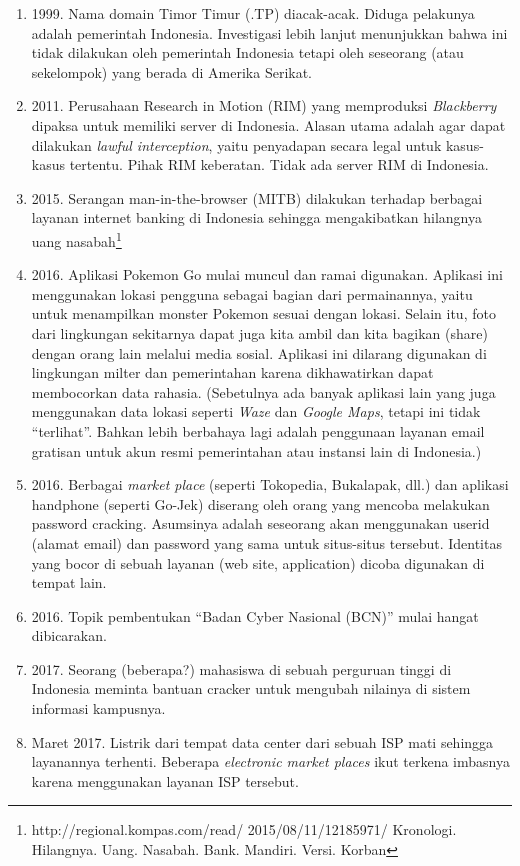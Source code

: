 \begin{enumerate}
\item 1999. Nama domain Timor Timur (.TP) diacak-acak.
   Diduga pelakunya adalah pemerintah Indonesia.
   Investigasi lebih lanjut menunjukkan bahwa ini tidak dilakukan
   oleh pemerintah Indonesia tetapi oleh seseorang (atau sekelompok)
   yang berada di Amerika Serikat.
\item 2011. Perusahaan Research in Motion (RIM) yang memproduksi
   {\em Blackberry} dipaksa untuk memiliki server di Indonesia.
   Alasan utama adalah agar dapat dilakukan {\em lawful interception},
   yaitu penyadapan secara legal untuk kasus-kasus tertentu.
   Pihak RIM keberatan. Tidak ada server RIM di Indonesia.
\item 2015. Serangan man-in-the-browser (MITB) dilakukan terhadap
   berbagai layanan internet banking di Indonesia sehingga mengakibatkan
   hilangnya uang nasabah\footnote{http://regional.kompas.com/read/
   2015/08/11/12185971/
   Kronologi. Hilangnya. Uang. Nasabah. Bank. Mandiri.
   Versi. Korban}
\item 2016. Aplikasi Pokemon Go mulai muncul dan ramai digunakan.
   Aplikasi ini menggunakan lokasi pengguna sebagai bagian dari
   permainannya, yaitu untuk menampilkan monster Pokemon sesuai
   dengan lokasi.
   Selain itu, foto dari lingkungan sekitarnya dapat juga kita ambil
   dan kita bagikan (share) dengan orang lain melalui media sosial.
   Aplikasi ini dilarang digunakan di lingkungan milter dan
   pemerintahan karena dikhawatirkan dapat membocorkan data rahasia.
   (Sebetulnya ada banyak aplikasi lain yang juga menggunakan data
   lokasi seperti {\em Waze} dan {\em Google Maps}, tetapi ini tidak
   ``terlihat''. Bahkan lebih berbahaya lagi adalah penggunaan
   layanan email gratisan untuk akun resmi pemerintahan atau instansi
   lain di Indonesia.)
\item 2016.
   Berbagai {\em market place} (seperti Tokopedia, Bukalapak, dll.)
   dan aplikasi handphone (seperti Go-Jek) diserang oleh orang
   yang mencoba melakukan password cracking.
   Asumsinya adalah seseorang akan menggunakan userid (alamat email)
   dan password yang sama untuk situs-situs tersebut.
   Identitas yang bocor di sebuah layanan (web site, application)
   dicoba digunakan di tempat lain. 
\item 2016. Topik pembentukan ``Badan Cyber Nasional (BCN)''
   mulai hangat dibicarakan.
\item 2017. Seorang (beberapa?) mahasiswa di sebuah perguruan tinggi
   di Indonesia meminta bantuan cracker untuk mengubah nilainya di
   sistem informasi kampusnya.
\item Maret 2017. Listrik dari tempat data center dari sebuah ISP mati sehingga
   layanannya terhenti. Beberapa {\em electronic market places} ikut terkena
      imbasnya karena menggunakan layanan ISP tersebut.
\end{enumerate}

